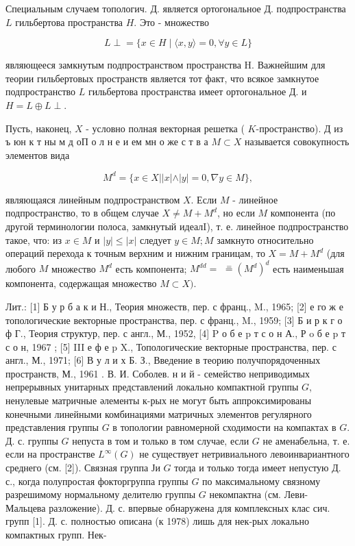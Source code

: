 \documentclass[10pt]{article}
\begin{document}
Специальным случаем топологич. Д. является ортогональное Д. подпространства $L$ гильбертова пространства $H$. Это - множество



\[

L \perp=\{x \in H \mid\langle x, y\rangle=0, \forall y \in L\}

\]



являющееся замкнутым подпространством пространства H. Важнейшим для теории гильбертовых пространств является тот факт, что всякое замкнутое подпространство $L$ гильбертова пространства имеет ортогональное Д. и $H=L \oplus L \perp$.



Пусть, наконец, $X$ - условно полная векторная решетка ( $K$-пространство). Д из ъ юн к т ны м д оП о л н е и ем мн о же с т в а $M \subset X$ называется совокупность элементов вида



\[

M^{d}=\{x \in X|| x|\wedge| y \mid=0, \nabla y \in M\},

\]



являющаяся линейным подпространством $X$. Если $M$ - линейное подпространство, то в общем случае $X \neq M+M^{d}$, но если $M$ компонента (по другой терминологии полоса, замкнутый идеалI), т. е. линейное подпространство такое, что: из $x \in M$ и $|y| \leqslant|x|$ следует $y \in M ; M$ замкнуто относительно операций перехода к точным верхним и нижним границам, то $X=M+M^{d}$ (для любого $M$ множество $M^{d}$ есть компонента; $M^{d d}=$ $\stackrel{=}{=}\left(M^{d}\right)^{d}$ есть наименьшая компонента, содержащая множество $M \subset X)$.



Лит.: [1] Б у р б а к и Н., Теория множеств, пер. с франц., M., 1965; [2] е го ж е топологические векторные пространства, пер. с франц., M., 1959; [3] Б и р к г о ф Г., Теория структур, пер. с англ., М., 1952, [4] P о б е p т с о н А., Р o б е p т с о н, 1967 ; [5] III е ф е p X., Топологические векторные пространства, пер. с англ., М., 1971; [6] В у л и х Б. З., Введение в теорию получпорядоченных пространств, М., 1961 . В. И. Соболев. н и й - семейство неприводимых непрерывных унитарных представлений локально компактной группы $G$, ненулевые матричные әлементы к-рых не могут быть аппроксимированы конечными линейными комбинациями матричных элементов регулярного представления группы $G$ в топологии равномерной сходимости на компактах в $G$. Д. с. группы $G$ непуста в том и только в том случае, если $G$ не аменабельна, т. е. если на пространстве $L^{\infty}(G)$ не существует нетривиального левоинвариантного среднего (см. [2]). Связная группа Ји $G$ тогда и только тогда имеет непустую Д. с., когда полупростая фокторгруппа группы $G$ по максимальному связному разрешимому нормальному делителю группы $G$ некомпактна (см. Леви- Мальцева разложение). Д. с. впервые обнаружена для комплексных клас сич. групп [1]. Д. с. полностью описана (к 1978) лишь для нек-рых локально компактных групп. Нек-
\end{document}
